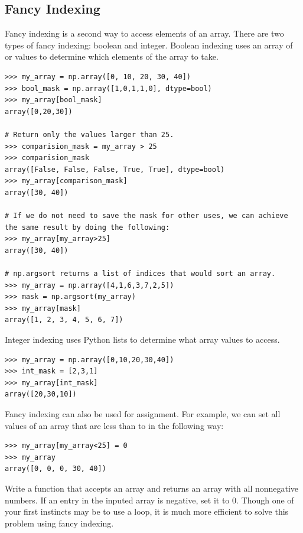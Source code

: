 \subsection*{Fancy Indexing} %

Fancy indexing is a second way to access elements of an array. 
There are two types of fancy indexing: boolean and integer. 
Boolean indexing uses an array of  or  values to 
determine which elements of the array to take. 

\begin{lstlisting}
>>> my_array = np.array([0, 10, 20, 30, 40])
>>> bool_mask = np.array([1,0,1,1,0], dtype=bool)
>>> my_array[bool_mask]
array([0,20,30])

# Return only the values larger than 25.
>>> comparision_mask = my_array > 25
>>> comparision_mask
array([False, False, False, True, True], dtype=bool)
>>> my_array[comparison_mask]
array([30, 40])

# If we do not need to save the mask for other uses, we can achieve the same result by doing the following:
>>> my_array[my_array>25]
array([30, 40])

# np.argsort returns a list of indices that would sort an array.
>>> my_array = np.array([4,1,6,3,7,2,5])
>>> mask = np.argsort(my_array)
>>> my_array[mask]
array([1, 2, 3, 4, 5, 6, 7])
\end{lstlisting}

Integer indexing uses Python lists to determine what array values to access.
\begin{lstlisting}
>>> my_array = np.array([0,10,20,30,40])
>>> int_mask = [2,3,1]
>>> my_array[int_mask]
array([20,30,10])
\end{lstlisting}

Fancy indexing can also be used for assignment.
For example, we can set all values of an array that are less than  to  in the following way:
\begin{lstlisting} 
>>> my_array[my_array<25] = 0
>>> my_array
array([0, 0, 0, 30, 40])
\end{lstlisting}

\begin{problem} %
Write a function that accepts an array and returns an array with all nonnegative numbers.
If an entry in the inputed array is negative, set it to $0$.
Though one of your first instincts may be to use a  loop, it is much more efficient to solve this problem using fancy indexing.
\end{problem}

